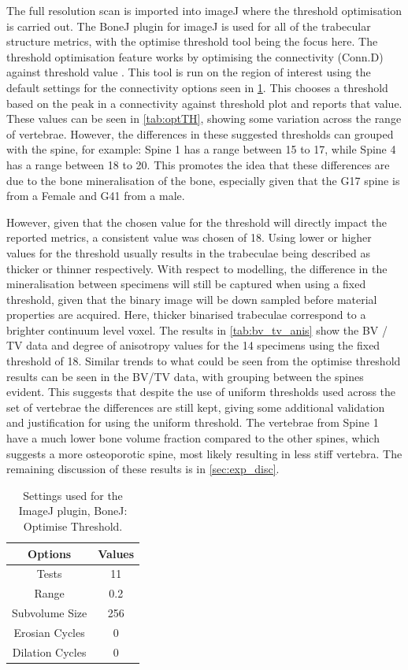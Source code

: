 The full resolution scan is imported into imageJ where the threshold
optimisation is carried out.
The BoneJ plugin for imageJ is used for all of the trabecular structure
metrics, with the optimise threshold tool being the focus here.
The threshold optimisation feature works by optimising the connectivity
(Conn.D) against threshold value \autocite{Doubea2010}.
This tool is run on the region of interest using the default settings for the
connectivity options seen in \cref{tab:bonej}.
This chooses a threshold based on the peak in a connectivity against threshold
plot and reports that value.
These values can be seen in \cref{tab:optTH}, showing some variation across the
range of vertebrae.
However, the differences in these suggested thresholds can grouped with the
spine, for example: Spine 1 has a range between 15 to 17, while Spine 4 has a
range between 18 to 20.
This promotes the idea that these differences are due to the bone
mineralisation of the bone, especially given that the G17 spine is from a
Female and G41 from a male.

However, given that the chosen value for the threshold will directly impact the
reported metrics, a consistent value was chosen of 18. Using lower or higher
values for the threshold usually results in the trabeculae being described as
thicker or thinner respectively.
With respect to modelling, the difference in the mineralisation between specimens will still be
captured when using a fixed threshold, given that the binary image will be down
sampled before material properties are acquired. Here, thicker binarised
trabeculae correspond to a brighter continuum level voxel.
The results in \cref{tab:bv_tv_anis} show the BV / TV data and degree of
anisotropy values for the 14 specimens using the fixed threshold of 18.
Similar trends to what could be seen from the optimise threshold results can be
seen in the BV/TV data, with grouping between the
spines evident. This suggests that despite the use of uniform thresholds used
across the set of vertebrae the differences are still kept, giving some
additional validation and justification for using the uniform threshold.
The vertebrae from Spine 1 have a much lower bone volume fraction compared to the other
spines, which suggests a more osteoporotic spine, most likely resulting in less
stiff vertebra. The remaining discussion of these results is in
\cref{sec:exp_disc}.

\begin{table}[ht!]
	\caption{Settings used for the ImageJ plugin, BoneJ: Optimise Threshold.}
	\label{tab:bonej}
	\centering
	\begin{tabular}{c|c}
    Options & Values \\
    \hline
    \hline
    Tests & 11  \\
    Range & 0.2 \\
    Subvolume Size & 256 \\
    Erosian Cycles & 0 \\
    Dilation Cycles & 0 \\
    \hline
	\end{tabular}
\end{table}

